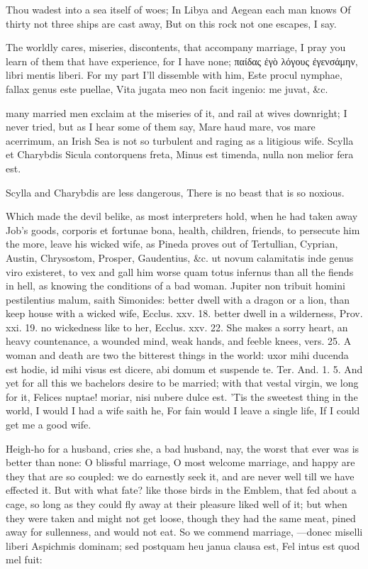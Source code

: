 {Thou wadest into a sea itself of woes;
In Libya and Aegean each man knows
Of thirty not three ships are cast away,
But on this rock not one escapes, I say.

The worldly cares, miseries, discontents, that accompany marriage, I
pray you learn of them that have experience, for I have none; 
παίδας ἐγὸ λόγους ἐγενσάμην, libri mentis liberi. For my part I'll
dissemble with him,
Este procul nymphae, fallax genus este puellae,
Vita jugata meo non facit ingenio: me juvat, \&c.

many married men exclaim at the miseries of it, and rail at wives
downright; I never tried, but as I hear some of them say, Mare
haud mare, vos mare acerrimum, an Irish Sea is not so turbulent and
raging as a litigious wife.
Scylla et Charybdis Sicula contorquens freta,
Minus est timenda, nulla non melior fera est.

Scylla and Charybdis are less dangerous,
There is no beast that is so noxious.

Which made the devil belike, as most interpreters hold, when he had
taken away Job's goods, corporis et fortunae bona, health, children,
friends, to persecute him the more, leave his wicked wife, as Pineda
proves out of Tertullian, Cyprian, Austin, Chrysostom, Prosper,
Gaudentius, \&c. ut novum calamitatis inde genus viro existeret, to vex
and gall him worse quam totus infernus than all the fiends in hell, as
knowing the conditions of a bad woman. Jupiter non tribuit homini
pestilentius malum, saith Simonides: better dwell with a dragon or a
lion, than keep house with a wicked wife, Ecclus. xxv. 18. better dwell
in a wilderness, Prov. xxi. 19. no wickedness like to her, Ecclus. xxv.
22. She makes a sorry heart, an heavy countenance, a wounded mind, weak
hands, and feeble knees, vers. 25. A woman and death are two the
bitterest things in the world: uxor mihi ducenda est hodie, id mihi
visus est dicere, abi domum et suspende te. Ter. And. 1. 5. And yet for
all this we bachelors desire to be married; with that vestal virgin, we
long for it, Felices nuptae! moriar, nisi nubere dulce est. 'Tis
the sweetest thing in the world, I would I had a wife saith he,
For fain would I leave a single life,
If I could get me a good wife.

Heigh-ho for a husband, cries she, a bad husband, nay, the worst that
ever was is better than none: O blissful marriage, O most welcome
marriage, and happy are they that are so coupled: we do earnestly seek
it, and are never well till we have effected it. But with what fate?
like those birds in the Emblem, that fed about a cage, so long as
they could fly away at their pleasure liked well of it; but when they
were taken and might not get loose, though they had the same meat,
pined away for sullenness, and would not eat. So we commend marriage,
---donec miselli liberi
Aspichmis dominam; sed postquam heu janua clausa est,
Fel intus est quod mel fuit:

}
